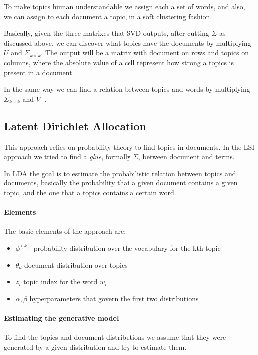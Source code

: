 To make topics human understandable 
we assign each a set of words, and also, we can assign to each 
document a topic, in a soft clustering fashion.

Basically, given the three matrixes that SVD outputs, after 
cutting $\Sigma$ as discussed above,   
we can discover what topics have the documents by multiplying 
$U$ and $\Sigma_{k \times k}$. The output will be a matrix with document 
on rows and topics on columns, where the absolute value of 
a cell represent how strong a topics is present in a document.

In the same way we can find a relation between topics and words 
by multiplying $\Sigma_{k \times k}$ and $V^\top$.

\subsection{Latent Dirichlet Allocation}
This approach relies on probability theory to find topics
in documents. 
In the LSI approach we tried to find a \emph{glue}, formally $\Sigma$,
between document and terms.

In LDA the goal is to estimate the probabilistic relation 
between topics and documents, basically the probability that 
a given document contains a given topic, and the one that 
a topics contains a certain word.

\paragraph{Elements}
The basic elements of the approach are:
\begin{itemize}
    \item $\phi^{(k)}$ probability distribution over the vocabulary 
    for the kth topic
    \item $\theta_d$ document distribution over topics
    \item $z_i$ topic index for the word $w_i$
    \item $\alpha, \beta$ hyperparameters that govern the first 
    two distributions
\end{itemize}

\paragraph{Estimating the generative model}
To find the topics and document distributions we 
assume that they were generated by a given distribution
and try to estimate them.
